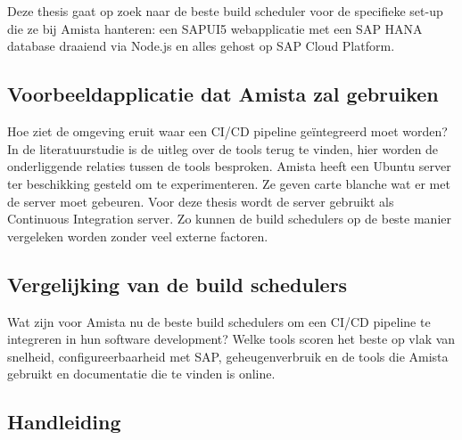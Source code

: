 
\chapter{}
\label{ch:methodologie}

Deze thesis gaat op zoek naar de beste build scheduler voor de specifieke set-up die ze bij Amista hanteren: een SAPUI5 webapplicatie met een SAP HANA database draaiend via Node.js en alles gehost op SAP Cloud Platform.



\section{Voorbeeldapplicatie dat Amista zal gebruiken}
\label{sec:voorbeeldapplicatie}
Hoe ziet de omgeving eruit waar een CI/CD pipeline geïntegreerd moet worden? In de literatuurstudie is de uitleg over de tools terug te vinden, hier worden de onderliggende relaties tussen de tools besproken.
Amista heeft een Ubuntu server ter beschikking gesteld om te experimenteren. Ze geven carte blanche wat er met de server moet gebeuren.
Voor deze thesis wordt de server gebruikt als Continuous Integration server. Zo kunnen de build schedulers op de beste manier vergeleken worden zonder veel externe factoren.

\section{Vergelijking van de build schedulers}
\label{sec:Vergelijking-build-schedulers}
Wat zijn voor Amista nu de beste build schedulers om een CI/CD pipeline te integreren in hun software development? Welke tools scoren het beste op vlak van snelheid, configureerbaarheid met SAP, geheugenverbruik en de tools die Amista gebruikt en documentatie die te vinden is online.

\section{Handleiding}
\label{sec:handleiding}